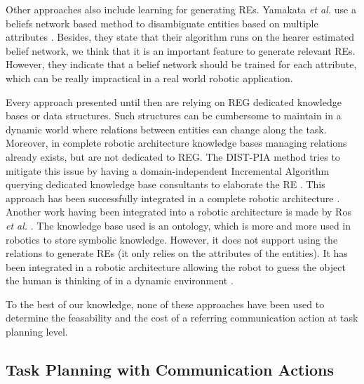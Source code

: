 \documentclass[a4paper,11pt,twoside]{StyleThese}
\begin{document}
Other approaches also include learning for generating REs. Yamakata \textit{et al.} use a beliefs network based method to disambiguate entities based on multiple attributes \cite{yamakata2004belief}. Besides, they state that their algorithm runs on the hearer estimated belief network, we think that it is an important feature to generate relevant REs. However, they indicate that a belief network should be trained for each attribute, which can be really impractical in a real world robotic application.

Every approach presented until then are relying on REG dedicated knowledge bases or data structures. Such structures can be cumbersome to maintain in a dynamic world where relations between entities can change along the task. Moreover, in complete robotic architecture knowledge bases managing relations already exists, but are not dedicated to REG. The DIST-PIA method tries to mitigate this issue by having a domain-independent Incremental Algorithm querying dedicated knowledge base consultants to elaborate the RE \cite{williams2017referring}. This approach has been successfully integrated in a complete robotic architecture \cite{williams2019dempster}. Another work having been integrated into a robotic architecture is made by Ros \textit{et al.} \cite{ros2010one}. The knowledge base used is an ontology, which is more and more used in robotics to store symbolic knowledge. However, it does not support using the relations to generate REs (it only relies on the attributes of the entities). It has been integrated in a robotic architecture allowing the robot to guess the object the human is thinking of in a dynamic environment \cite{lemaignan2012grounding}.

To the best of our knowledge, none of these approaches have been used to determine the feasability and the cost of a referring communication action at task planning level.



\subsection{Task Planning with Communication Actions}
\end{document}
